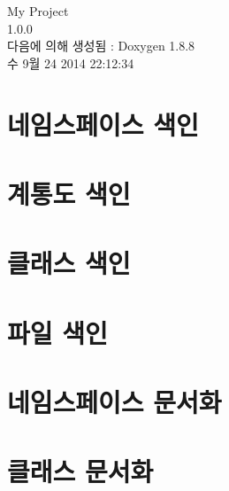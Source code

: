\documentclass[twoside]{book}
\newcommand{\+}{\discretionary{\mbox{\scriptsize$\hookleftarrow$}}{}{}}
\newcommand{\clearemptydoublepage}{%
  \newpage{\pagestyle{empty}\cleardoublepage}%
}
\begin{document}
\hypersetup{pageanchor=false,
             bookmarks=true,
             bookmarksnumbered=true,
             pdfencoding=unicode
            }
\begin{titlepage}
\vspace*{7cm}
\begin{center}%
{\Large My Project \\[1ex]\large 1.\+0.\+0 }\\
\vspace*{1cm}
{\large 다음에 의해 생성됨 \+:  Doxygen 1.8.8}\\
\vspace*{0.5cm}
{\small 수 9월 24 2014 22:12:34}\\
\end{center}
\end{titlepage}
\clearemptydoublepage
\tableofcontents
\clearemptydoublepage
{}
\hypersetup{pageanchor=true}

\chapter{네임스페이스 색인}

\chapter{계통도 색인}

\chapter{클래스 색인}

\chapter{파일 색인}

\chapter{네임스페이스 문서화}


\chapter{클래스 문서화}










\end{document}
